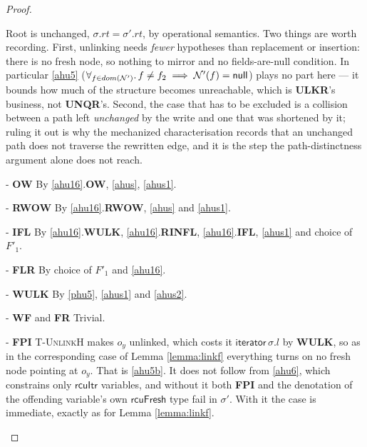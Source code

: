 \begin{proof}
\begin{case}
Root is unchanged, $\sigma.rt = \sigma'.rt$, by operational semantics.  Two things
are worth recording.  First, unlinking needs \emph{fewer} hypotheses than
replacement or insertion: there is no fresh node, so nothing to mirror and no
fields-are-null condition.  In particular \ref{ahu5}
($\forall_{f\in dom(\mathcal{N}')}\ldotp f\neq f_2 \implies \mathcal{N}'(f) = \textsf{null}$) plays
no part here --- it bounds how much of the structure becomes unreachable, which is
\textbf{ULKR}'s business, not \textbf{UNQR}'s.  Second, the case that has to be
excluded is a collision between a path left \emph{unchanged} by the write and one
that was shortened by it; ruling it out is why the mechanized characterisation
records that an unchanged path does not traverse the rewritten edge, and it is the
step the path-distinctness argument alone does not reach.
\end{case}
\begin{case} - \textbf{OW} By \ref{ahu16}.\textbf{OW}, \ref{ahus}, \ref{ahus1}.
\end{case}
\begin{case} - \textbf{RWOW} By \ref{ahu16}.\textbf{RWOW}, \ref{ahus} and \ref{ahus1}.
\end{case}
\begin{case} - \textbf{IFL} By \ref{ahu16}.\textbf{WULK}, \ref{ahu16}.\textbf{RINFL}, \ref{ahu16}.\textbf{IFL}, \ref{ahus1} and choice of $F'_1$.
\end{case}
\begin{case} - \textbf{FLR} By choice of $F'_1$ and \ref{ahu16}. 
\end{case}
\begin{case} - \textbf{WULK} By \ref{phu5},  \ref{ahus1} and \ref{ahus2}.
\end{case}
\begin{case} - \textbf{WF} and \textbf{FR} Trivial.
\end{case}
\begin{case} - \textbf{FPI}
\textsc{T-UnlinkH} makes $o_y$ \textsf{unlinked}, which costs it
$\textsf{iterator}\,\sigma.l$ by \textbf{WULK}, so as in the corresponding case
of Lemma \ref{lemma:linkf} everything turns on no \textsf{fresh} node pointing
at $o_y$.  That is \ref{ahu5b}.  It does not follow from \ref{ahu6}, which
constrains only $\textsf{rcuItr}$ variables, and without it both \textbf{FPI}
and the denotation of the offending variable's own $\textsf{rcuFresh}$ type fail
in $\sigma'$.  With it the case is immediate, exactly as for
Lemma \ref{lemma:linkf}.
\end{case}

\end{proof}

